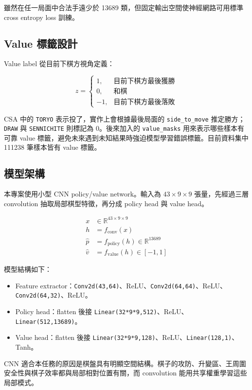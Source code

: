 \documentclass[12pt,a4paper,fontset=none]{ctexart}
\begin{document}
雖然在任一局面中合法手遠少於 13689 類，但固定輸出空間使神經網路可用標準 cross entropy loss 訓練。

\subsection{Value 標籤設計}
Value label 從目前下棋方視角定義：

\[
z =
\begin{cases}
1, & \text{目前下棋方最後獲勝}\\
0, & \text{和棋}\\
-1, & \text{目前下棋方最後落敗}
\end{cases}
\]

CSA 中的 \texttt{TORYO} 表示投了，實作上會根據最後局面的 \texttt{side\_to\_move} 推定勝方；\texttt{DRAW} 與 \texttt{SENNICHITE} 則標記為 0。後來加入的 \texttt{value\_masks} 用來表示哪些樣本有可靠 value 標籤，避免未來遇到未知結果時強迫模型學習錯誤標籤。目前資料集中 111238 筆樣本皆有 value 標籤。

\subsection{模型架構}
本專案使用小型 CNN policy/value network。輸入為 $43 \times 9 \times 9$ 張量，先經過三層 convolution 抽取局部棋型特徵，再分成 policy head 與 value head。

\begin{align*}
x &\in \mathbb{R}^{43 \times 9 \times 9}\\
h &= f_{\text{conv}}(x)\\
\hat{p} &= f_{\text{policy}}(h) \in \mathbb{R}^{13689}\\
\hat{v} &= f_{\text{value}}(h) \in [-1,1]
\end{align*}

模型結構如下：

\begin{itemize}
  \item Feature extractor：\texttt{Conv2d(43,64)}、ReLU、\texttt{Conv2d(64,64)}、ReLU、\texttt{Conv2d(64,32)}、ReLU。
  \item Policy head：flatten 後接 \texttt{Linear(32*9*9,512)}、ReLU、\texttt{Linear(512,13689)}。
  \item Value head：flatten 後接 \texttt{Linear(32*9*9,128)}、ReLU、\texttt{Linear(128,1)}、Tanh。
\end{itemize}

CNN 適合本任務的原因是棋盤具有明顯空間結構。棋子的攻防、升變區、王周圍安全性與棋子效率都與局部相對位置有關，而 convolution 能用共享權重學習這些局部模式。
\end{document}
